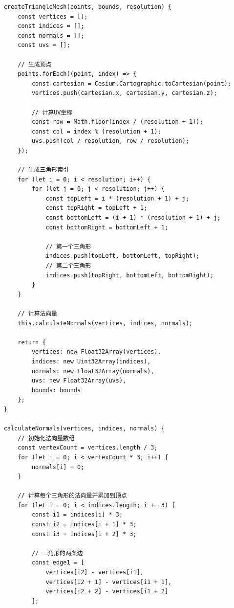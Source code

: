 \begin{lstlisting}
    createTriangleMesh(points, bounds, resolution) {
        const vertices = [];
        const indices = [];
        const normals = [];
        const uvs = [];
        
        // 生成顶点
        points.forEach((point, index) => {
            const cartesian = Cesium.Cartographic.toCartesian(point);
            vertices.push(cartesian.x, cartesian.y, cartesian.z);
            
            // 计算UV坐标
            const row = Math.floor(index / (resolution + 1));
            const col = index % (resolution + 1);
            uvs.push(col / resolution, row / resolution);
        });
        
        // 生成三角形索引
        for (let i = 0; i < resolution; i++) {
            for (let j = 0; j < resolution; j++) {
                const topLeft = i * (resolution + 1) + j;
                const topRight = topLeft + 1;
                const bottomLeft = (i + 1) * (resolution + 1) + j;
                const bottomRight = bottomLeft + 1;
                
                // 第一个三角形
                indices.push(topLeft, bottomLeft, topRight);
                // 第二个三角形
                indices.push(topRight, bottomLeft, bottomRight);
            }
        }
        
        // 计算法向量
        this.calculateNormals(vertices, indices, normals);
        
        return {
            vertices: new Float32Array(vertices),
            indices: new Uint32Array(indices),
            normals: new Float32Array(normals),
            uvs: new Float32Array(uvs),
            bounds: bounds
        };
    }
    
    calculateNormals(vertices, indices, normals) {
        // 初始化法向量数组
        const vertexCount = vertices.length / 3;
        for (let i = 0; i < vertexCount * 3; i++) {
            normals[i] = 0;
        }
        
        // 计算每个三角形的法向量并累加到顶点
        for (let i = 0; i < indices.length; i += 3) {
            const i1 = indices[i] * 3;
            const i2 = indices[i + 1] * 3;
            const i3 = indices[i + 2] * 3;
            
            // 三角形的两条边
            const edge1 = [
                vertices[i2] - vertices[i1],
                vertices[i2 + 1] - vertices[i1 + 1],
                vertices[i2 + 2] - vertices[i1 + 2]
            ];
            

\end{lstlisting}
